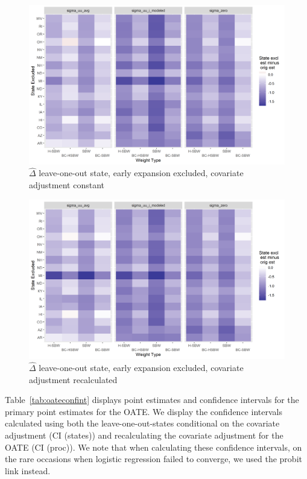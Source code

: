 \documentclass[12pt]{article}
\begin{document}
\begin{figure}[]
\begin{center}
    \includegraphics[scale=0.6]{01_Plots/loostate-repub-sensitivityc2-state-main.png}
    \caption{$\hat{\Delta}$ leave-one-out state, early expansion excluded, covariate adjustment constant}
    \label{fig:rdiffc2state}
\end{center}
\end{figure}

\begin{figure}[]
\begin{center}
    \includegraphics[scale=0.6]{01_Plots/loostate-repub-sensitivityc2-proc-main.png}
    \caption{$\hat{\Delta}$ leave-one-out state, early expansion excluded, covariate adjustment recalculated}
    \label{fig:rdiffc2proc}
\end{center}
\end{figure}

Table~\ref{tab:oateconfint} displays point estimates and confidence intervals for the primary point estimates for the OATE. We display the confidence intervals calculated using both the leave-one-out-states conditional on the covariate adjustment (CI (states)) and recalculating the covariate adjustment for the OATE (CI (proc)). We note that when calculating these confidence intervals, on the rare occasions when logistic regression failed to converge, we used the probit link instead.
\end{document}
